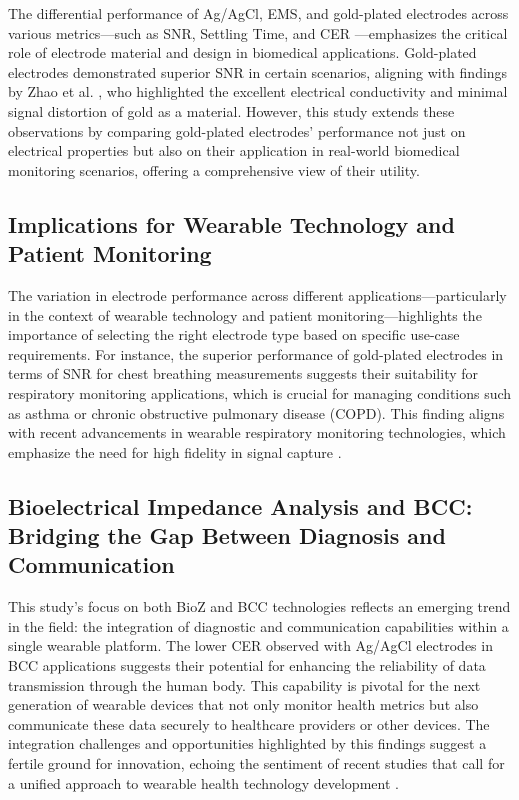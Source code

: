 \documentclass[conference]{IEEEtran}
\begin{document}
The differential performance of Ag/AgCl, EMS, and gold-plated electrodes across various metrics—such as \gls{SNR}, Settling Time, and \gls{CER} —emphasizes the critical role of electrode material and design in biomedical applications. Gold-plated electrodes demonstrated superior \gls{SNR} in certain scenarios, aligning with findings by Zhao et al. \cite{Zhao2018Fabrication}, who highlighted the excellent electrical conductivity and minimal signal distortion of gold as a material. However, this study extends these observations by comparing gold-plated electrodes' performance not just on electrical properties but also on their application in real-world biomedical monitoring scenarios, offering a comprehensive view of their utility.

\subsection{Implications for Wearable Technology and Patient Monitoring}

The variation in electrode performance across different applications—particularly in the context of wearable technology and patient monitoring—highlights the importance of selecting the right electrode type based on specific use-case requirements. For instance, the superior performance of gold-plated electrodes in terms of \gls{SNR} for chest breathing measurements suggests their suitability for respiratory monitoring applications, which is crucial for managing conditions such as asthma or chronic obstructive pulmonary disease (COPD). This finding aligns with recent advancements in wearable respiratory monitoring technologies, which emphasize the need for high fidelity in signal capture \cite{rabbani2023low}.

\subsection{Bioelectrical Impedance Analysis   and BCC: Bridging the Gap Between Diagnosis and Communication}

This study's focus on both \gls{BioZ}   and \gls{BCC} technologies reflects an emerging trend in the field: the integration of diagnostic and communication capabilities within a single wearable platform. The lower \gls{CER} observed with Ag/AgCl electrodes in \gls{BCC} applications suggests their potential for enhancing the reliability of data transmission through the human body. This capability is pivotal for the next generation of wearable devices that not only monitor health metrics but also communicate these data securely to healthcare providers or other devices. The integration challenges and opportunities highlighted by this findings suggest a fertile ground for innovation, echoing the sentiment of recent studies that call for a unified approach to wearable health technology development \cite{zaira2023prediction}.
\end{document}

